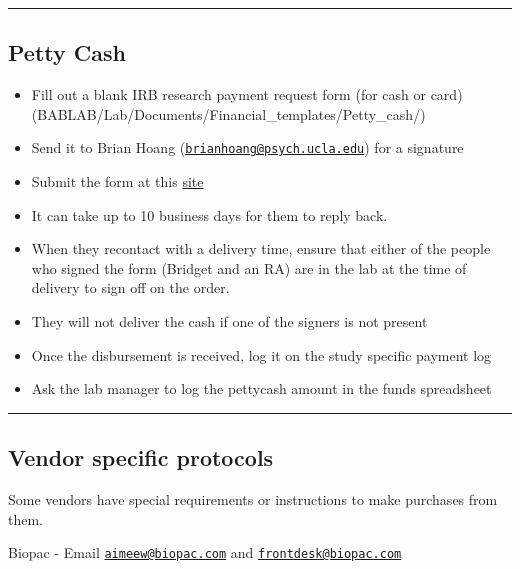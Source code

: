 \documentclass[]{book}
\providecommand{\tightlist}{%
  \setlength{\itemsep}{0pt}\setlength{\parskip}{0pt}}
\begin{document}
\begin{center}\rule{0.5\linewidth}{0.5pt}\end{center}

\hypertarget{petty-cash}{%
\subsection{Petty Cash}\label{petty-cash}}

\begin{itemize}
\tightlist
\item
  Fill out a blank IRB research payment request form (for cash or card)(BABLAB/Lab/Documents/Financial\_templates/Petty\_cash/)
\item
  Send it to Brian Hoang (\href{mailto:brianhoang@psych.ucla.edu}{\nolinkurl{brianhoang@psych.ucla.edu}}) for a signature
\item
  Submit the form at this \href{https://sa.ucla.edu/MessageCenter/OneStop/Home/PostMessage?topicId=293}{site}
\item
  It can take up to 10 business days for them to reply back.
\item
  When they recontact with a delivery time, ensure that either of the people who signed the form (Bridget and an RA) are in the lab at the time of delivery to sign off on the order.
\item
  They will not deliver the cash if one of the signers is not present
\item
  Once the disbursement is received, log it on the study specific payment log
\item
  Ask the lab manager to log the pettycash amount in the funds spreadsheet
\end{itemize}

\begin{center}\rule{0.5\linewidth}{0.5pt}\end{center}

\hypertarget{vendor-specific-protocols}{%
\subsection{Vendor specific protocols}\label{vendor-specific-protocols}}

Some vendors have special requirements or instructions to make purchases from them.

Biopac
- Email \href{mailto:aimeew@biopac.com}{\nolinkurl{aimeew@biopac.com}} and \href{mailto:frontdesk@biopac.com}{\nolinkurl{frontdesk@biopac.com}}
\end{document}
